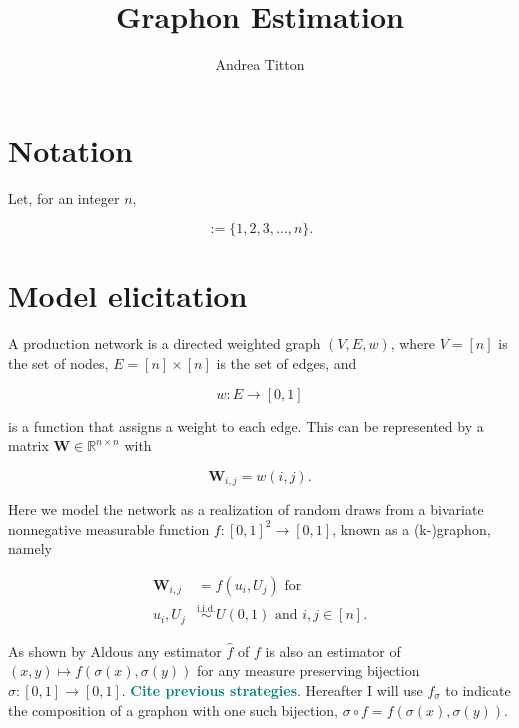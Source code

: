 \documentclass[american, abstract=on]{scrartcl}
\author{Andrea Titton}
\title{Graphon Estimation}
\renewcommand{\Re}{\mathbb{R}}
\newcommand{\matr}[1]{\mathbf{#1}}
\newcommand\notes[1]{\textcolor{teal}{\textbf{#1}}}
\begin{document}
\maketitle

\section{Notation}

Let, for an integer $n$,

\begin{equation}
  [n] := \{1, 2, 3, \ldots, n \}.
\end{equation}

\section{Model elicitation}

A production network is a directed weighted graph $(V, E, w)$, where $V = [n]$ is the set of nodes, $E = [n] \times [n]$ is the set of edges, and 

\begin{equation}
  w: E \to [0, 1]
\end{equation}

is a function that assigns a weight to each edge. This can be represented by a matrix $\matr{W} \in \Re^{n \times n}$ with 

\begin{equation}
  \matr{W}_{i, j} = w(i, j).
\end{equation}

Here we model the network as a realization of random draws from a bivariate nonnegative measurable function $f: [0, 1]^2 \to [0, 1]$, known as a (k-)graphon, namely

\begin{equation}
  \begin{split}
    \matr{W}_{i, j} &= f(u_i, U_j) \text{ for } \\
    u_i, U_j &\overset{\text{i.i.d.}}{\sim} U(0, 1) \text{ and } i, j \in [n].
  \end{split}
\end{equation}

As shown by Aldous any estimator $\hat{f}$ of $f$ is also an estimator of $(x, y) \mapsto f(\sigma(x), \sigma(y))$ for any measure preserving bijection $\sigma:[0, 1] \to [0, 1]$. \notes{Cite previous strategies}. Hereafter I will use $f_\sigma$ to indicate the composition of a graphon with one such bijection, $\sigma \circ f = f(\sigma(x), \sigma(y))$.
\end{document}
